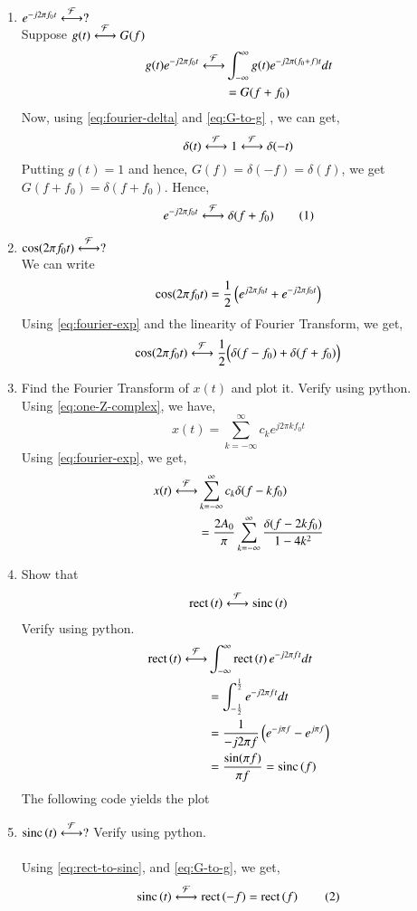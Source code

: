 \documentclass[journal,12pt,twocolumn]{IEEEtran}
\renewcommand\thesection{\arabic{section}}
\begin{document}
\begin{enumerate}[label=\thesection.\arabic*, ref=\thesection.\theenumi]
\item $e^{-j2\pi f_0t}\overset{\mathcal{F}}{ \longleftrightarrow}?$ \\
	\solution Suppose \( g(t) \overset{\mathcal{F}}{ \longleftrightarrow} G(f) \)
	\begin{align*}
		g(t) e^{-j2\pi f_0 t} \overset{\mathcal{F}}{ \longleftrightarrow} & \int_{-\infty}^\infty g(t) e^{-j2 \pi \left(f_0 + f\right) t} dt \\
		&= G(f + f_0)
	\end{align*}
	Now, using \eqref{eq:fourier-delta} and \eqref{eq:G-to-g} , we can get,
	\[ \delta(t) \overset{\mathcal{F}}{ \longleftrightarrow} 1 \overset{\mathcal{F}}{ \longleftrightarrow} \delta(-t) \]
	Putting \( g(t) = 1 \) and hence, \( G(f) = \delta(-f) = \delta(f) \), 
	we get \( G(f + f_0) = \delta(f+f_0) \). Hence,
	\[ e^{-j2\pi f_0t} \system{F} \delta(f+f_0) \numberthis \label{eq:fourier-exp} \]
	

\item $\cos(2\pi f_0t)\overset{\mathcal{F}}{ \longleftrightarrow}?$ \\
	\solution We can write
	\[ \cos(2\pi f_0t) = \frac{1}{2} \left(e^{j2\pi f_0t} + e^{-j2\pi f_0t}\right) \]
	Using \eqref{eq:fourier-exp} and the linearity of Fourier Transform, we get,
	\[ \cos(2\pi f_0t) \overset{\mathcal{F}}{ \longleftrightarrow} \frac{1}{2}\Big{(} \delta(f-f_0) + \delta(f+f_0) \Big{)} \]


\item Find the Fourier Transform of $x(t)$ and plot it.  Verify using python. \\
	\solution
	Using \eqref{eq:one-Z-complex}, we have,
	\[ x(t) = \sum_{k = -\infty}^{\infty}c_ke^{j2\pi kf_0 t} \]
	Using \eqref{eq:fourier-exp}, we get, 
	\begin{align*}
		x(t) \overset{\mathcal{F}}{ \longleftrightarrow} & \sum_{k=-\infty}^\infty c_k \delta(f-kf_0) \\
		&= \frac{2A_0}{\pi} \sum_{k=-\infty}^\infty \frac{\delta(f-2kf_0)}{1-4k^2} \\
	\end{align*}
	

\item Show that
	\begin{align}
		\text{rect}\left(t\right) \overset{\mathcal{F}}{ \longleftrightarrow} \text{sinc}\left(t\right)
		\label{eq:rect-to-sinc}
	\end{align}
	Verify using python. \\
	\solution
	\begin{align*}
		\text{rect}\left(t\right) \overset{\mathcal{F}}{ \longleftrightarrow} & \int_{-\infty}^\infty \text{rect}\left(t\right) e^{-j2\pi ft} dt \\
		&= \int_{-\frac{1}{2}}^{\frac{1}{2}} e^{-j2\pi ft} dt \\
		&= \frac{1}{-j2\pi f} \left(e^{-j\pi f} - e^{j\pi f}\right) \\
		&= \frac{\sin(\pi f)}{\pi f} = \text{sinc}\left(f\right)
	\end{align*}
	The following code yields the plot

\item 
	$\text{sinc}\left(t\right)\overset{\mathcal{F}}{ \longleftrightarrow} ?$
	Verify using python. \\
	\solution \\
	Using \eqref{eq:rect-to-sinc}, and \eqref{eq:G-to-g}, we get,
	\[ \sinc{t} \system{F} \rect{-f} = \rect{f} \numberthis \label{eq:sinc-to-rect} \]


\end{enumerate}
\end{document}
